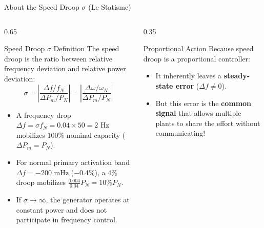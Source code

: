 \begin{frame}{About the Speed Droop $\sigma$ (Le Statisme)}
\begin{columns}[T]
\begin{column}{0.65\textwidth}
    \footnotesize
    \begin{block}{Speed Droop $\sigma$ Definition}
    \scriptsize
    The speed droop is the ratio between relative frequency deviation and relative power deviation:
    \begin{equation*}
        \sigma = \left| \frac{\Delta f / f_N}{\Delta P_m / P_N} \right| = \left| \frac{\Delta \omega / \omega_N}{\Delta P_m / P_N} \right|
    \end{equation*}
    \end{block}
    \begin{itemize}\setlength{\itemsep}{2pt}
        \item A frequency drop $\Delta f = \sigma f_N = 0.04 \times 50 = 2\text{ Hz}$ mobilizes $100\%$ nominal capacity ($\Delta P_m = P_N$).
        \item For normal primary activation band $\Delta f = -200\text{ mHz}$ ($-0.4\%$), a $4\%$ droop mobilizes $\frac{0.004}{0.04} P_N = 10\% P_N$.
        \item If $\sigma \to \infty$, the generator operates at constant power and does not participate in frequency control.
    \end{itemize}
\end{column}
\begin{column}{0.35\textwidth}
    \begin{alertblock}{Proportional Action}
    \scriptsize
    Because speed droop is a proportional controller:
    \begin{itemize}\setlength{\itemsep}{1pt}
        \item It inherently leaves a \textbf{steady-state error} ($\Delta f \neq 0$).
        \item But this error is the \textbf{common signal} that allows multiple plants to share the effort without communicating!
    \end{itemize}
    \end{alertblock}
\end{column}
\end{columns}
\end{frame}

